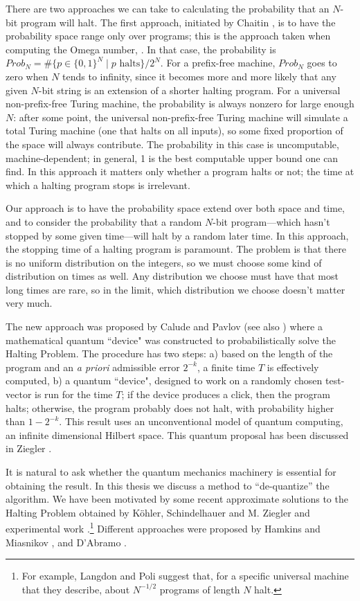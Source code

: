 \documentclass[12pt,twoside,openright]{report}
\begin{document}
There are two approaches we can take to calculating the probability that an $N$-bit program will halt.  The first approach, initiated by Chaitin \cite{Chaitin1975},  is to have the probability space range only over programs; this is the approach taken when computing the Omega number, \cite{CDS,Calude}.  In that case, the probability is $Prob_N = \#\{p \in \{0, 1\}^N \mid p  \mbox{ halts}\}/2^N.$  For a prefix-free machine, $Prob_N$ goes to zero when $N$ tends to infinity, since it becomes more and more likely that any given $N$-bit string is an extension of a shorter halting program.  For a universal non-prefix-free Turing machine, the probability is always nonzero for large enough $N$: after some point, the  universal non-prefix-free Turing machine will simulate a total Turing machine (one that halts on all inputs), so some fixed proportion of the space will always contribute.  The probability in this case is uncomputable, machine-dependent; in general, 1 is the best computable upper bound one can find. In this approach it matters only whether a program halts or not; the time at which a halting program stops is irrelevant.

Our approach is to have the probability space extend over both space and time, and to consider the probability that a random $N$-bit program---which hasn't stopped by some given time---will halt by a random later time.  In this approach, the stopping time of a halting program is paramount. The problem is that there is no uniform distribution on the integers, so we must choose some kind of distribution on times as well.  Any distribution we choose must have that most long times are rare, so in the limit, which distribution we choose doesn't matter very much.

The new approach was proposed by Calude and Pavlov \cite{CP} (see also \cite{ACP}) where a mathematical quantum ``device" was constructed to probabilistically solve the Halting Problem.  The procedure has two steps: a) based on the length of the program and an  {\it a priori} admissible error $2^{-k}$, a finite time $T$ is effectively computed, b) a quantum ``device", designed to work on a randomly chosen test-vector is run for the time $T$; if the device produces a click, then the program halts; otherwise, the program probably does not halt, with probability higher than $1-2^{-k}$. This result uses an unconventional model of quantum computing, an infinite dimensional Hilbert space.  This  quantum proposal has been discussed in  Ziegler \cite{Z}.

 It is natural to ask whether the quantum mechanics machinery is essential for obtaining the result.  In this thesis we discuss a method to ``de-quantize'' the algorithm.  We have been motivated by some recent approximate solutions to the Halting Problem obtained by K\"ohler,  Schindelhauer  and  M. Ziegler \cite{KSZ} and experimental work \cite{CDS,LP}.\footnote{For example, Langdon and Poli \cite{LP} suggest that, for a specific universal machine that they describe, about $N^{-1/2}$ programs of length $N$ halt.}
Different approaches were proposed by Hamkins and Miasnikov 
\cite{HM}, and D'Abramo \cite{D'A}.
\end{document}
